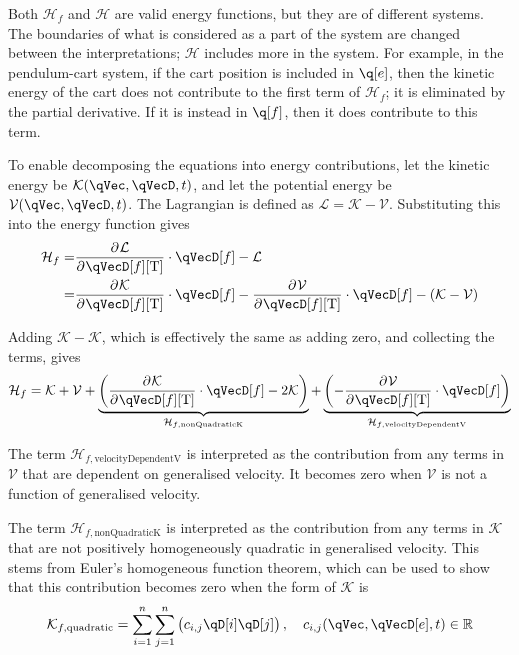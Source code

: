 \documentclass[11pt]{article}
\newcommand{\pD}[2]{
    \frac{\partial\mspace{1mu}#1}{\partial\mspace{1mu}#2}
}
\begin{document}
Both $\mathcal{H}_f$ and $\mathcal{H}$ are valid energy functions, but they are of different systems. The boundaries of what is considered as a part of the system are changed between the interpretations; $\mathcal{H}$ includes more in the system. For example, in the pendulum-cart system, if the cart position is included in $\q[e]$, then the kinetic energy of the cart does not contribute to the first term of $\mathcal{H}_f$; it is eliminated by the partial derivative. If it is instead in $\q[f]$, then it does contribute to this term.

To enable decomposing the equations into energy contributions, let the kinetic energy be $\mathcal{K}(\qVec, \qVecD, t)$, and let the potential energy be $\mathcal{V}(\qVec, \qVecD, t)$. The Lagrangian is defined as $\mathcal{L} = \mathcal{K} - \mathcal{V}$. Substituting this into the energy function gives
\begin{align}
    \mathcal{H}_f
    =& \pD{\mathcal{L}}{\qVecD[f][\mathrm{T}]} \cdot \qVecD[f] - \mathcal{L} \nonumber\\
    =& \pD{\mathcal{K}}{\qVecD[f][\mathrm{T}]} \cdot \qVecD[f]
        - \pD{\mathcal{V}}{\qVecD[f][\mathrm{T}]} \cdot \qVecD[f]
         - (\mathcal{K} - \mathcal{V})
\end{align}

Adding $\mathcal{K}-\mathcal{K}$, which is effectively the same as adding zero, and collecting the terms, gives
\begin{equation}
    \mathcal{H}_f
    = \mathcal{K} + \mathcal{V}
        + \underbrace{\del{\pD{\mathcal{K}}{\qVecD[f][\mathrm{T}]} \cdot \qVecD[f] - 2\mathcal{K}}}_{\mathcal{H}_{f,\mathrm{nonQuadraticK}}}
        + \underbrace{\del{- \pD{\mathcal{V}}{\qVecD[f][\mathrm{T}]} \cdot \qVecD[f]}}_{\mathcal{H}_{f,\mathrm{velocityDependentV}}}
\end{equation}

The term $\mathcal{H}_{f,\mathrm{velocityDependentV}}$ is interpreted as the contribution from any terms in $\mathcal{V}$ that are dependent on generalised velocity. It becomes zero when $\mathcal{V}$ is not a function of generalised velocity.

The term $\mathcal{H}_{f,\mathrm{nonQuadraticK}}$ is interpreted as the contribution from any terms in $\mathcal{K}$ that are not positively homogeneously quadratic in generalised velocity. This stems from Euler's homogeneous function theorem, which can be used to show that this contribution becomes zero when the form of $\mathcal{K}$ is
\begin{equation}
    \mathcal{K}_{f,\mathrm{quadratic}} = \sum_{i=1}^{n}\sum_{j=1}^{n}\del{c_{i,j}\qD[i]\qD[j]}
    ,\quad c_{i,j}(\qVec, \qVecD[e], t)\in\mathbb{R}
\end{equation}
\end{document}
